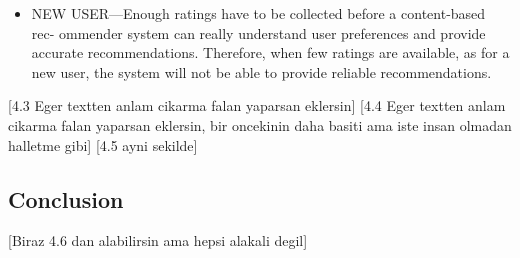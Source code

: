\begin{itemize}
	\item NEW USER—Enough ratings have to be collected before a content-based rec- ommender system can really understand user preferences and provide accurate recommendations. Therefore, when few ratings are available, as for a new user, the system will not be able to provide reliable recommendations.
\end{itemize}

[4.3 Eger textten anlam cikarma falan yaparsan eklersin]
[4.4 Eger textten anlam cikarma falan yaparsan eklersin, bir oncekinin daha basiti ama iste insan olmadan halletme gibi]
[4.5 ayni sekilde]

\subsection{Conclusion}
[Biraz 4.6 dan alabilirsin ama hepsi alakali degil]



